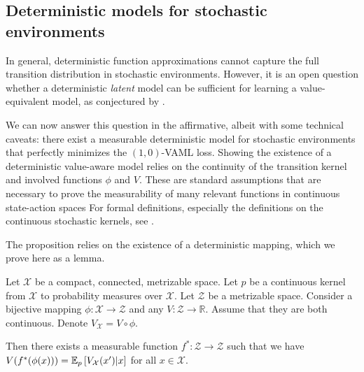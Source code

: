 \subsection{Deterministic models for stochastic environments}
\label{sec:cvaml:theory_2}

In general, deterministic function approximations cannot capture the full transition distribution in stochastic environments.
However, it is an open question whether a deterministic \emph{latent} model can be sufficient for learning a value-equivalent model, as conjectured by \textcite{oh2017value}.

We can now answer this question in the affirmative, albeit with some technical caveats: there exist a measurable deterministic model for stochastic environments that perfectly minimizes the $(1,0)$-VAML loss.
Showing the existence of a deterministic value-aware model relies on the continuity of the transition kernel and involved functions $\phi$ and $V$.
These are standard assumptions that are necessary to prove the measurability of many relevant functions in continuous state-action spaces
For formal definitions, especially the definitions on the continuous stochastic kernels, see \textcite[p.134]{bertsekasshreve1978}. 


The proposition relies on the existence of a deterministic mapping, which we prove here as a lemma.


\begin{lemma}
\label{lem:cvaml:deterministic_representation_lemma}
    Let $\mathcal{X}$ be a compact, connected, metrizable space. Let $p$ be a continuous kernel from $\mathcal{X}$ to probability measures over $\mathcal{X}$. Let $\mathcal{Z}$ be a metrizable space. Consider a bijective mapping $\phi: \mathcal{X} \rightarrow \mathcal{Z}$ and any $V: \mathcal{Z} \rightarrow \mathbb{R}$. Assume that they are both continuous. Denote $V_\mathcal{X} = V \circ \phi$.
    
    Then there exists a measurable function $f^*: \mathcal{Z} \rightarrow \mathcal{Z}$ such that we have $V(f^*(\phi(x))) = \mathbb{E}_{p}\left[  V_\mathcal{X}(x')|x \right]$ for all $x \in \mathcal{X}$.
\end{lemma}

